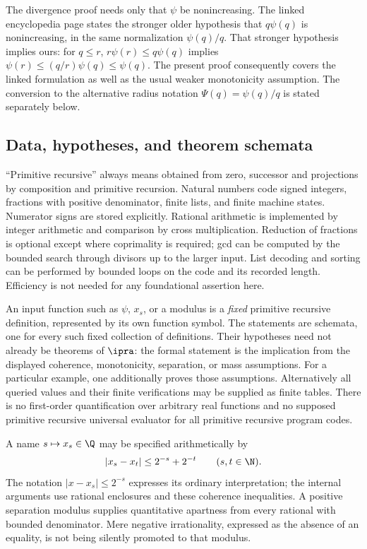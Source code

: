 The divergence proof needs only that $\psi$ be nonincreasing.  The linked
encyclopedia page states the stronger older hypothesis that $q\psi(q)$
is nonincreasing, in the same normalization $\psi(q)/q$.  That stronger
hypothesis implies ours: for $q\le r$, $r\psi(r)\le q\psi(q)$ implies
$\psi(r)\le(q/r)\psi(q)\le\psi(q)$.  The present proof consequently
covers the linked formulation as well as the usual weaker monotonicity
assumption.  The conversion to the alternative radius notation
$\Psi(q)=\psi(q)/q$ is stated separately below.

\subsection{Data, hypotheses, and theorem schemata}

``Primitive recursive'' always means obtained from zero, successor and
projections by composition and primitive recursion.  Natural numbers
code signed integers, fractions with positive denominator, finite lists,
and finite machine states.  Numerator signs are stored explicitly.
Rational arithmetic is implemented by integer arithmetic and comparison
by cross multiplication.  Reduction of fractions is optional except where
coprimality is required; gcd can be computed by the bounded search through
divisors up to the larger input.  List decoding and sorting can be performed
by bounded loops on the code and its recorded length.  Efficiency is not
needed for any foundational assertion here.

An input function such as $\psi$, $x_s$, or a modulus is a \emph{fixed}
primitive recursive definition, represented by its own function symbol.
The statements are schemata, one for every such fixed collection of
definitions.  Their hypotheses need not already be theorems of $\ipra$:
the formal statement is the implication from the displayed coherence,
monotonicity, separation, or mass assumptions.  For a particular example,
one additionally proves those assumptions.  Alternatively all queried
values and their finite verifications may be supplied as finite tables.
There is no first-order quantification over arbitrary real functions and
no supposed primitive recursive universal evaluator for all primitive
recursive program codes.

A name $s\mapsto x_s\in\Q$ may be specified arithmetically by
\[
 |x_s-x_t|\le2^{-s}+2^{-t}\qquad(s,t\in\N).
\]
The notation $|x-x_s|\le2^{-s}$ expresses its ordinary interpretation;
the internal arguments use rational enclosures and these coherence
inequalities.  A positive separation modulus supplies quantitative
apartness from every rational with bounded denominator.  Mere negative
irrationality, expressed as the absence of an equality, is not being
silently promoted to that modulus.

